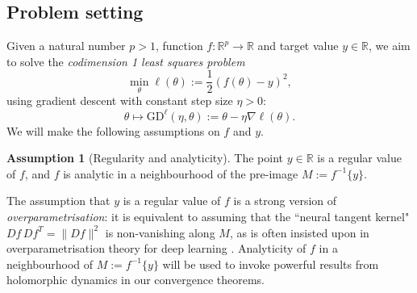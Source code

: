 \documentclass{article}
\newcommand{\RB}{\mathbb{R}}
\newcommand{\GD}{\mathrm{GD}}
\theoremstyle{plain}
\theoremstyle{definition}
\newtheorem{assumption}[theorem]{Assumption}
\theoremstyle{remark}
\begin{document}
\subsection{Problem setting}


Given a natural number $p>1$, function $f:\RB^p\rightarrow\RB$ and target value $y\in\RB$, we aim to solve the \emph{codimension 1 least squares problem}
\begin{equation}
    \min_{\theta}\ell(\theta):=\frac{1}{2}(f(\theta)-y)^2,\label{eq:objective}
\end{equation}
using gradient descent with constant step size $\eta>0$:
\begin{equation}
    \theta\mapsto \GD^{\ell}(\eta,\theta):=\theta-\eta\nabla\ell(\theta).
\end{equation}
We will make the following assumptions on $f$ and $y$.

\begin{assumption}[Regularity and analyticity]\label{ass:overparametrisation}
    The point $y\in\RB$ is a regular value of $f$, and $f$ is analytic in a neighbourhood of the pre-image $M:=f^{-1}\{y\}$.
\end{assumption}

The assumption that $y$ is a regular value of $f$ is a strong version of \emph{overparametrisation}: it is equivalent to assuming that the ``neural tangent kernel" $Df\,Df^T = \|Df\|^2$ is non-vanishing along $M$, as is often insisted upon in overparametrisation theory for deep learning \cite{jacot, bombari}. Analyticity of $f$ in a neighbourhood of $M:=f^{-1}\{y\}$ will be used to invoke powerful results from holomorphic dynamics  \cite{hakimhigher} in our convergence theorems.
\end{document}
